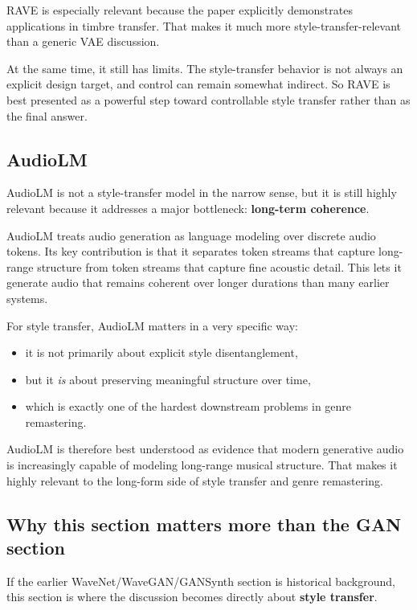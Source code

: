 \documentclass[11pt]{article}
\begin{document}
RAVE is especially relevant because the paper explicitly demonstrates applications in timbre transfer. That makes it much more style-transfer-relevant than a generic VAE discussion.

At the same time, it still has limits. The style-transfer behavior is not always an explicit design target, and control can remain somewhat indirect. So RAVE is best presented as a powerful step toward controllable style transfer rather than as the final answer.

\subsection{AudioLM}

AudioLM is not a style-transfer model in the narrow sense, but it is still highly relevant because it addresses a major bottleneck: \textbf{long-term coherence}.

AudioLM treats audio generation as language modeling over discrete audio tokens. Its key contribution is that it separates token streams that capture long-range structure from token streams that capture fine acoustic detail. This lets it generate audio that remains coherent over longer durations than many earlier systems.

For style transfer, AudioLM matters in a very specific way:

\begin{itemize}
\item it is not primarily about explicit style disentanglement,
\item but it \emph{is} about preserving meaningful structure over time,
\item which is exactly one of the hardest downstream problems in genre remastering.
\end{itemize}

AudioLM is therefore best understood as evidence that modern generative audio is increasingly capable of modeling long-range musical structure. That makes it highly relevant to the long-form side of style transfer and genre remastering.

\subsection{Why this section matters more than the GAN section}

If the earlier WaveNet/WaveGAN/GANSynth section is historical background, this section is where the discussion becomes directly about \textbf{style transfer}.
\end{document}
